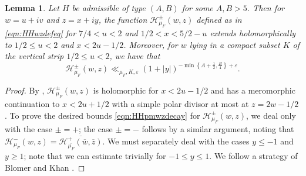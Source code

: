 \documentclass[11pt,a4paper]{amsart}
\newcommand{\e}{\varepsilon}
\newcommand{\HH}{\mathcal{H}}
\numberwithin{equation}{section}
\newtheorem{lemma}[equation]{Lemma}
\theoremstyle{remark}
\theoremstyle{definition}
\begin{document}
\begin{lemma}
\label{lem:HHpmwzbounds}
Let $H$ be admissible of type $(A,B)$ for some $A,B > 5$. Then for $w = u + iv$ and $z = x + iy$, the function $\HH_{\mu_F}^{\pm}(w,z)$ defined as in \eqref{eqn:HHwzdefeq} for $7/4 < u < 2$ and $1/2 < x < 5/2 - u$ extends holomorphically to $1/2 \leq u < 2$ and $x < 2u - 1/2$. Moreover, for $w$ lying in a compact subset $K$ of the vertical strip $1/2 \leq u < 2$, we have that
\begin{equation}
\label{eqn:HHpmwzdecay}
\HH_{\mu_F}^{\pm}(w,z) \ll_{\mu_F,K,\e} (1 + |y|)^{-\min\left\{A + \frac{1}{2},\frac{B}{4}\right\} + \e}.
\end{equation}
\end{lemma}

\begin{proof}
By \cite[Lemma 10]{BK19}, $\HH_{\mu_F}^{\pm}(w,z)$ is holomorphic for $x < 2u - 1/2$ and has a meromorphic continuation to $x < 2u + 1/2$ with a simple polar divisor at most at $z = 2w - 1/2$. To prove the desired bounds \eqref{eqn:HHpmwzdecay} for $\HH_{\mu_F}^{\pm}(w,z)$, we deal only with the case $\pm = +$; the case $\pm = -$ follows by a similar argument, noting that $\HH_{\mu_F}^{-}(w,z) = \overline{\HH_{\overline{\mu_F}}^{+}(\overline{w},\overline{z})}$. We must separately deal with the cases $y \leq -1$ and $y \geq 1$; note that we can estimate trivially for $-1 \leq y \leq 1$. We follow a strategy of Blomer and Khan \cite[Proof of Lemma 11]{BK19}.


\end{proof}
\end{document}
